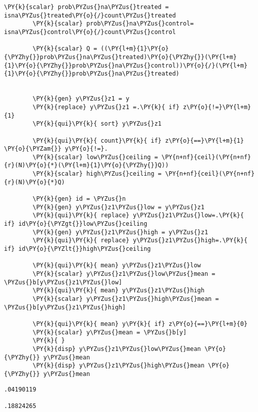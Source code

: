 \documentclass[11pt,notitlepage]{article}\usepackage[]{graphicx}\usepackage[]{color}
\makeatletter
\newenvironment{kframe}{%
 \def\at@end@of@kframe{}%
 \ifinner\ifhmode%
  \def\at@end@of@kframe{\end{minipage}}%
  \begin{minipage}{\columnwidth}%
 \fi\fi%
 \def\FrameCommand##1{\hskip\@totalleftmargin \hskip-\fboxsep
 \colorbox{shadecolor}{##1}\hskip-\fboxsep
     \hskip-\linewidth \hskip-\@totalleftmargin \hskip\columnwidth}%
 \MakeFramed {\advance\hsize-\width
   \@totalleftmargin\z@ \linewidth\hsize
   \@setminipage}}%
 {\par\unskip\endMakeFramed%
 \at@end@of@kframe}
\newenvironment{knitrout}{}{} %
\makeatother
\begin{document}
\begin{enumerate}[a)]
\begin{knitrout}
\begin{kframe}
\begin{Verbatim}[commandchars=\\\{\}]
        \PY{k}{scalar} prob\PYZus{}na\PYZus{}treated = isna\PYZus{}treated\PY{o}{/}count\PYZus{}treated
        \PY{k}{scalar} prob\PYZus{}na\PYZus{}control= isna\PYZus{}control\PY{o}{/}count\PYZus{}control
        
        \PY{k}{scalar} Q = ((\PY{l+m}{1}\PY{o}{\PYZhy{}}prob\PYZus{}na\PYZus{}treated)\PY{o}{\PYZhy{}}(\PY{l+m}{1}\PY{o}{\PYZhy{}}prob\PYZus{}na\PYZus{}control))\PY{o}{/}(\PY{l+m}{1}\PY{o}{\PYZhy{}}prob\PYZus{}na\PYZus{}treated)
        
        
        \PY{k}{gen} y\PYZus{}z1 = y
        \PY{k}{replace} y\PYZus{}z1 =.\PY{k}{ if} z\PY{o}{!=}\PY{l+m}{1}
        \PY{k}{qui}\PY{k}{ sort} y\PYZus{}z1
        
        \PY{k}{qui}\PY{k}{ count}\PY{k}{ if} z\PY{o}{==}\PY{l+m}{1} \PY{o}{\PYZam{}} y\PY{o}{!=}.
        \PY{k}{scalar} low\PYZus{}ceiling = \PY{n+nf}{ceil}(\PY{n+nf}{r}(N)\PY{o}{*}(\PY{l+m}{1}\PY{o}{\PYZhy{}}Q))
        \PY{k}{scalar} high\PYZus{}ceiling = \PY{n+nf}{ceil}(\PY{n+nf}{r}(N)\PY{o}{*}Q)
        
        \PY{k}{gen} id = \PYZus{}n
        \PY{k}{gen} y\PYZus{}z1\PYZus{}low = y\PYZus{}z1
        \PY{k}{qui}\PY{k}{ replace} y\PYZus{}z1\PYZus{}low=.\PY{k}{ if} id\PY{o}{\PYZgt{}}low\PYZus{}ceiling
        \PY{k}{gen} y\PYZus{}z1\PYZus{}high = y\PYZus{}z1
        \PY{k}{qui}\PY{k}{ replace} y\PYZus{}z1\PYZus{}high=.\PY{k}{ if} id\PY{o}{\PYZlt{}}high\PYZus{}ceiling
        
        \PY{k}{qui}\PY{k}{ mean} y\PYZus{}z1\PYZus{}low
        \PY{k}{scalar} y\PYZus{}z1\PYZus{}low\PYZus{}mean = \PYZus{}b[y\PYZus{}z1\PYZus{}low]
        \PY{k}{qui}\PY{k}{ mean} y\PYZus{}z1\PYZus{}high
        \PY{k}{scalar} y\PYZus{}z1\PYZus{}high\PYZus{}mean = \PYZus{}b[y\PYZus{}z1\PYZus{}high]
        
        \PY{k}{qui}\PY{k}{ mean} y\PY{k}{ if} z\PY{o}{==}\PY{l+m}{0}
        \PY{k}{scalar} y\PYZus{}mean = \PYZus{}b[y]
        \PY{k}{ }
        \PY{k}{disp} y\PYZus{}z1\PYZus{}low\PYZus{}mean \PY{o}{\PYZhy{}} y\PYZus{}mean
        \PY{k}{disp} y\PYZus{}z1\PYZus{}high\PYZus{}mean \PY{o}{\PYZhy{}} y\PYZus{}mean
\end{Verbatim}

    \begin{Verbatim}[commandchars=\\\{\}]
.04190119

.18824265

    \end{Verbatim}
\end{kframe}
\end{knitrout}




\end{enumerate}
\end{document}

